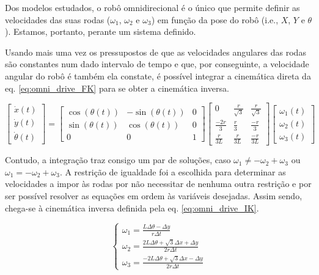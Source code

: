 \documentclass{article}
\begin{document}
Dos modelos estudados, o robô omnidirecional é o único que permite definir as velocidades das suas rodas ($\omega_1$, $\omega_2$ e $\omega_3$) em função da pose do robô (i.e., $X$, $Y$ e $\theta$). Estamos, portanto, perante um sistema definido.

Usando mais uma vez os pressupostos de que as velocidades angulares das rodas são constantes num dado intervalo de tempo e que, por conseguinte, a velocidade angular do robô é também ela constate, é possível integrar a cinemática direta da eq. \ref{eq:omni_drive_FK} para se obter a cinemática inversa. 

\begin{equation}
    \begin{bmatrix}
        \dot{x}(t) \\
        \dot{y}(t) \\
        \dot{\theta}(t) 
    \end{bmatrix} = 
    \begin{bmatrix}
        \cos(\theta(t)) & -\sin(\theta(t)) & 0 \\
        \sin(\theta(t)) & \cos(\theta(t)) & 0 \\
        0 & 0 & 1
    \end{bmatrix}
    \begin{bmatrix}
        0 & \frac{r}{\sqrt{3}} & \frac{r}{\sqrt{3}} \\
        \frac{-2r}{3} & \frac{r}{3} & \frac{-r}{3} \\
        \frac{r}{3L} & \frac{r}{3L} & \frac{-r}{3L}
    \end{bmatrix}
    \begin{bmatrix}
        \omega_1(t) \\
        \omega_2(t) \\
        \omega_3(t) 
    \end{bmatrix}
    \label{eq:omni_drive_FK}
\end{equation}

Contudo, a integração traz consigo um par de soluções, caso $\omega_1 \neq -\omega_2 + \omega_3$ ou $\omega_1 = -\omega_2 + \omega_3$. A restrição de igualdade foi a escolhida para determinar as velocidades a impor às rodas por não necessitar de nenhuma outra restrição e por ser possível resolver as equações em ordem às variáveis desejadas. Assim sendo, chega-se à cinemática inversa definida pela eq. \ref{eq:omni_drive_IK}.

\begin{equation}
    \begin{cases}
        \omega_{1} = \frac{L \Delta \theta - \Delta y}{r \Delta t} \\
        \omega_{2} = \frac{2 L \Delta \theta + \sqrt{3} \Delta x + \Delta y}{2 r \Delta t} \\
        \omega_{3} = \frac{- 2 L \Delta \theta + \sqrt{3} \Delta x - \Delta y}{2 r \Delta t}
    \end{cases}
    \label{eq:omni_drive_IK}
\end{equation}
\end{document}
